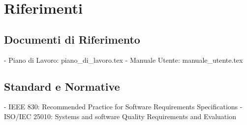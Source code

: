 \section{Riferimenti}

\subsection{Documenti di Riferimento}

- Piano di Lavoro: piano\_di\_lavoro.tex
- Manuale Utente: manuale\_utente.tex

\subsection{Standard e Normative}

- IEEE 830: Recommended Practice for Software Requirements Specifications
- ISO/IEC 25010: Systems and software Quality Requirements and Evaluation